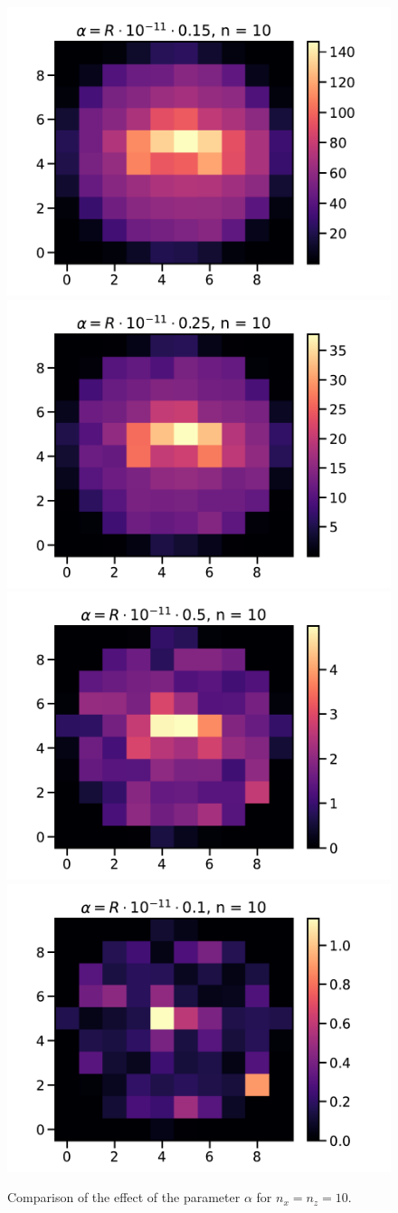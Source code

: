 \documentclass[a4paper,12pt]{article}
\begin{document}
\begin{figure}[H]
    \includegraphics[width=.6\textwidth]{../img-mpi/graph10-0.pdf}\hfill
    \includegraphics[width=.6\textwidth]{../img-mpi/graph10-1.pdf}\hfill
    \\[\smallskipamount]
    \includegraphics[width=.6\textwidth]{../img-mpi/graph10-2.pdf}\hfill
    \includegraphics[width=.6\textwidth]{../img-mpi/graph10-3.pdf}
    \caption{Comparison of the effect of the parameter \(\alpha\)
    for \(n_x = n_z = 10\).}
\end{figure}
\end{document}
